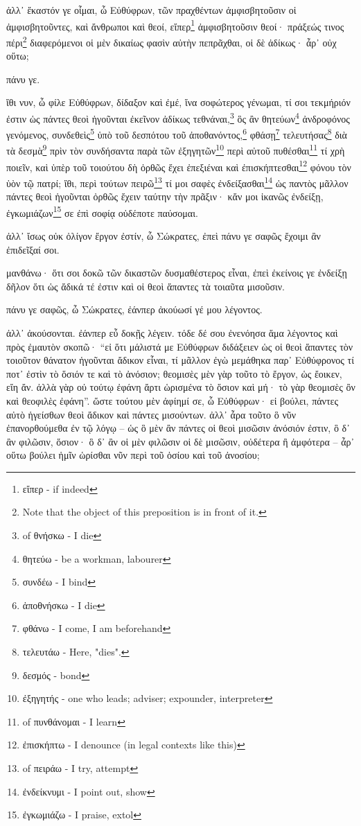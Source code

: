 ἀλλ᾽
ἕκαστόν
γε
οἶμαι,
ὦ
Εὐθύφρων,
τῶν
πραχθέντων
ἀμφισβητοῦσιν
οἱ
ἀμφισβητοῦντες,
καὶ
ἄνθρωποι
καὶ
θεοί,
εἴπερ\footnote{εἴπερ - if indeed}
ἀμφισβητοῦσιν
θεοί·
πράξεώς
τινος
πέρι\footnote{Note that the object of this preposition is in front of it.}
διαφερόμενοι
οἱ
μὲν
δικαίως
φασὶν
αὐτὴν
πεπρᾶχθαι,
οἱ
δὲ
ἀδίκως·
ἆρ᾽
οὐχ
οὕτω;

πάνυ
γε.


\versification{[9a]}
ἴθι
νυν,
ὦ
φίλε
Εὐθύφρων,
δίδαξον
καὶ
ἐμέ,
ἵνα
σοφώτερος
γένωμαι,
τί
σοι
τεκμήριόν
ἐστιν
ὡς
πάντες
θεοὶ
ἡγοῦνται
ἐκεῖνον
ἀδίκως
τεθνάναι,\footnote{ of θνήσκω - I die}
ὃς
ἂν
θητεύων\footnote{θητεύω - be a workman, labourer}
ἀνδροφόνος
γενόμενος,
συνδεθεὶς\footnote{συνδέω - I bind}
ὑπὸ
τοῦ
δεσπότου
τοῦ
ἀποθανόντος,\footnote{ἀποθνήσκω - I die}
φθάσῃ\footnote{φθάνω - I come, I am beforehand}
τελευτήσας\footnote{τελευτάω - Here, "dies".}
διὰ
τὰ
δεσμὰ\footnote{δεσμός - bond}
πρὶν
τὸν
συνδήσαντα
παρὰ
τῶν
ἐξηγητῶν\footnote{ἐξηγητής - one who leads; adviser; expounder, interpreter}
περὶ
αὐτοῦ
πυθέσθαι\footnote{ of πυνθάνομαι - I learn}
τί
χρὴ
ποιεῖν,
καὶ
ὑπὲρ
τοῦ
τοιούτου
δὴ
ὀρθῶς
ἔχει
ἐπεξιέναι
καὶ
ἐπισκήπτεσθαι\footnote{ἐπισκήπτω - I denounce (in legal contexts like this)}
φόνου
τὸν
ὑὸν
τῷ
πατρί;
ἴθι,
περὶ
τούτων
πειρῶ\footnote{ of πειράω - I try, attempt}
τί
μοι
\versification{[9b]}
σαφὲς
ἐνδείξασθαι\footnote{ἐνδείκνυμι - I point out, show}
ὡς
παντὸς
μᾶλλον
πάντες
θεοὶ
ἡγοῦνται
ὀρθῶς
ἔχειν
ταύτην
τὴν
πρᾶξιν·
κἄν
μοι
ἱκανῶς
ἐνδείξῃ,
ἐγκωμιάζων\footnote{ἐγκωμιάζω - I praise, extol}
σε
ἐπὶ
σοφίᾳ
οὐδέποτε
παύσομαι.

ἀλλ᾽
ἴσως
οὐκ
ὀλίγον
ἔργον
ἐστίν,
ὦ
Σώκρατες,
ἐπεὶ
πάνυ
γε
σαφῶς
ἔχοιμι
ἂν
ἐπιδεῖξαί
σοι.

μανθάνω·
ὅτι
σοι
δοκῶ
τῶν
δικαστῶν
δυσμαθέστερος
εἶναι,
ἐπεὶ
ἐκείνοις
γε
ἐνδείξῃ
δῆλον
ὅτι
ὡς
ἄδικά
τέ
ἐστιν
καὶ
οἱ
θεοὶ
ἅπαντες
τὰ
τοιαῦτα
μισοῦσιν.

πάνυ
γε
σαφῶς,
ὦ
Σώκρατες,
ἐάνπερ
ἀκούωσί
γέ
μου
λέγοντος.

\versification{[9c]}
ἀλλ᾽
ἀκούσονται.
ἐάνπερ
εὖ
δοκῇς
λέγειν.
τόδε
δέ
σου
ἐνενόησα
ἅμα
λέγοντος
καὶ
πρὸς
ἐμαυτὸν
σκοπῶ·
“εἰ
ὅτι
μάλιστά
με
Εὐθύφρων
διδάξειεν
ὡς
οἱ
θεοὶ
ἅπαντες
τὸν
τοιοῦτον
θάνατον
ἡγοῦνται
ἄδικον
εἶναι,
τί
μᾶλλον
ἐγὼ
μεμάθηκα
παρ᾽
Εὐθύφρονος
τί
ποτ᾽
ἐστὶν
τὸ
ὅσιόν
τε
καὶ
τὸ
ἀνόσιον;
θεομισὲς
μὲν
γὰρ
τοῦτο
τὸ
ἔργον,
ὡς
ἔοικεν,
εἴη
ἄν.
ἀλλὰ
γὰρ
οὐ
τούτῳ
ἐφάνη
ἄρτι
ὡρισμένα
τὸ
ὅσιον
καὶ
μή·
τὸ
γὰρ
θεομισὲς
ὂν
καὶ
θεοφιλὲς
ἐφάνη”.
ὥστε
τούτου
μὲν
ἀφίημί
σε,
ὦ
Εὐθύφρων·
εἰ
βούλει,
πάντες
αὐτὸ
\versification{[9d]}
ἡγείσθων
θεοὶ
ἄδικον
καὶ
πάντες
μισούντων.
ἀλλ᾽
ἆρα
τοῦτο
ὃ
νῦν
ἐπανορθούμεθα
ἐν
τῷ
λόγῳ
--
ὡς
ὃ
μὲν
ἂν
πάντες
οἱ
θεοὶ
μισῶσιν
ἀνόσιόν
ἐστιν,
ὃ
δ᾽
ἂν
φιλῶσιν,
ὅσιον·
ὃ
δ᾽
ἂν
οἱ
μὲν
φιλῶσιν
οἱ
δὲ
μισῶσιν,
οὐδέτερα
ἢ
ἀμφότερα
--
ἆρ᾽
οὕτω
βούλει
ἡμῖν
ὡρίσθαι
νῦν
περὶ
τοῦ
ὁσίου
καὶ
τοῦ
ἀνοσίου;

